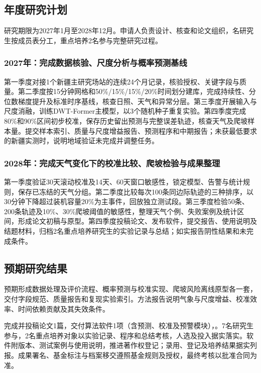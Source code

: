 \subsection{年度研究计划}
研究期限为2027年1月至2028年12月。申请人负责设计、核查和论文组织，名研究生按成员表分工，重点培养2名参与完整研究过程。

\subsubsection{2027年：完成数据核验、尺度分析与概率预测基线}
第一季度对接1个新疆主研究场站的连续24个月记录，核验授权、关键字段与质量。第二季度按15分钟网格和50\%/15\%/15\%/20\%时间划分建库，完成持续性、分位数梯度提升及标准时序基线，核查日照、天气和异常分层。第三季度开展输入与尺度消融，训练DWT-Former主模型，以3个随机种子重复实验。第四季度完成80\%和90\%区间初步校准，保存历史留出预测与完整误差轨迹，核查天气及爬坡样本量。提交样本索引、质量与尺度增益报告、预测程序和中期报告；未获最低要求的新疆实测时，说明地域验证未完成并调整任务。

\subsubsection{2028年：完成天气变化下的校准比较、爬坡检验与成果整理}
第一季度验证30天滚动校准及14天、60天窗口敏感性，锁定模型、告警与统计规则，保存已冻结的天气分组。第二季度比较每次100条同边际轨迹的三种排序，以30分钟下降超过装机容量20\%为主事件，回放独立测试段。第三季度检验50条、200条轨迹及10\%、30\%爬坡阈值的敏感性，整理天气个例、失败案例及统计区间，形成论文初稿与原型。第四季度投稿论文、发布软件，提交报告、使用说明及结题材料，归档2名重点培养研究生的实验记录与总结；如实报告阴性结果和未完成条件。

\subsection{预期研究结果}
预期形成数据处理及评价流程、概率预测与校准实现、爬坡风险离线原型各一套，交付字段规范、质量报告和复现实验索引。方法报告说明气象与尺度增益、校准效率、时间依赖贡献及其失效条件。

完成并投稿论文1篇，交付算法软件1项（含预测、校准及预警模块），。7名研究生参与，2名重点培养对象以实验记录、程序和总结考核，人选及投入据实落实。软件附版本、测试案例与使用说明，推进著作权登记；录用、登记及培养结果据实列报。成果署名、基金标注与档案移交遵照基金规则及授权，最终考核以批准合同为准。
